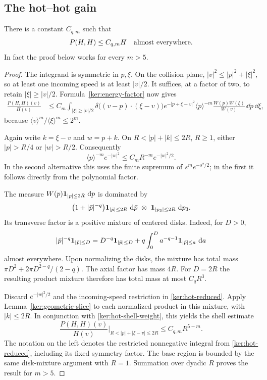 \subsection{The hot--hot gain}

\begin{lemma}\label{lem:hot-bound}
There is a constant $C_{q,m}$ such that
\begin{equation}\label{ker:hot-gain}
 P(H,H)\leq C_{q,m}H
 \quad\hbox{almost everywhere}.
\end{equation}
In fact the proof below works for every $m>5$.
\end{lemma}

\begin{proof}
The integrand is symmetric in $p,\xi$. On the collision plane,
$|v|^2\leq|p|^2+|\xi|^2$, so at least one incoming speed is at
least $|v|/2$. It suffices, at a factor of two, to retain
$|\xi|\geq|v|/2$. Formula~\eqref{ker:energy-factor} now gives
\begin{align}
 \frac{P(H,H)(v)}{H(v)}
 &\leq C_m\int_{|\xi|\geq|v|/2}
 \delta\bigl((v-p)\cdot(\xi-v)\bigr)
 e^{-|p+\xi-v|^2}\langle p\rangle^{-m}
 \frac{W(p)W(\xi)}{W(v)}\,\dd p\,\dd\xi,
 \label{ker:hot-reduced}
\end{align}
because $\langle v\rangle^m/\langle\xi\rangle^m\leq2^m$.

Again write $k=\xi-v$ and $w=p+k$. On
$R<|p|+|k|\leq2R$, $R\geq1$, either $|p|>R/4$ or $|w|>R/2$.
Consequently
\begin{equation}\label{ker:hot-shell-weight}
 \langle p\rangle^{-m}e^{-|w|^2}
 \leq C_mR^{-m}e^{-|w|^2/2}.
\end{equation}
In the second alternative this uses the finite supremum of
$s^m e^{-s^2/2}$; in the first it follows directly from the
polynomial factor.

The measure $W(p)\mathbf 1_{|p|\leq2R}\,\,\mathrm d p$ is dominated by
\[
 \bigl(1+|\bar p|^{-q}\bigr)
 \mathbf 1_{|\bar p|\leq2R}\,\,\mathrm d\bar p
 \ \otimes\ \mathbf 1_{|p_3|\leq2R}\,\,\mathrm d p_3.
\]
Its transverse factor is a positive mixture of centered disks.
Indeed, for $D>0$,
\[
 |\bar p|^{-q}\mathbf 1_{|\bar p|\leq D}
 =D^{-q}\mathbf 1_{|\bar p|\leq D}
   +q\int_0^D a^{-q-1}\mathbf 1_{|\bar p|\leq a}\,\,\mathrm d a
\]
almost everywhere. Upon normalizing the disks, the mixture has
total mass
$\pi D^2+2\pi D^{2-q}/(2-q)$. The axial factor has mass $4R$.
For $D=2R$ the resulting product mixture therefore has total mass
at most $C_qR^3$.

Discard $e^{-|w|^2/2}$ and the incoming-speed restriction in
\eqref{ker:hot-reduced}. Apply
Lemma~\ref{ker:geometric-slice} to each normalized product in this
mixture, with $|k|\leq2R$. In conjunction with
\eqref{ker:hot-shell-weight}, this yields the shell estimate
\begin{equation}\label{ker:hot-shell}
 \frac{P(H,H)(v)}{H(v)}\bigg|_{R<|p|+|\xi-v|\leq2R}
 \leq C_{q,m}R^{5-m}.
\end{equation}
The notation on the left denotes the restricted nonnegative
integral from \eqref{ker:hot-reduced}, including its fixed symmetry
factor. The base region is bounded by the same disk-mixture
argument with $R=1$. Summation over dyadic $R$ proves the result
for $m>5$.
\end{proof}

